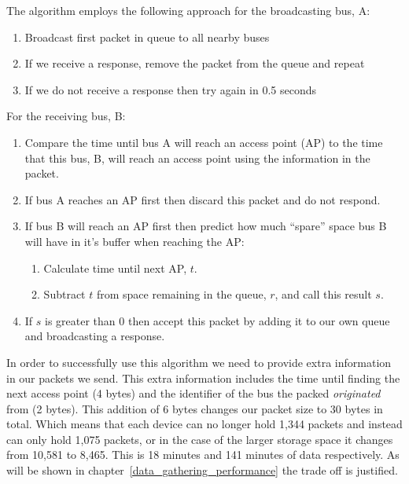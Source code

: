         The algorithm employs the following approach for the broadcasting bus, A:

        \begin{enumerate}
            \item Broadcast first packet in queue to all nearby buses
            \item If we receive a response, remove the packet from the queue and repeat
            \item If we do not receive a response then try again in 0.5 seconds
        \end{enumerate}

        For the receiving bus, B:

        \begin{enumerate}
            \item Compare the time until bus A will reach an access point (AP) to the time that this bus, B, will reach an access point using the information in the packet.
            \item If bus A reaches an AP first then discard this packet and do not respond.
            \item If bus B will reach an AP first then predict how much ``spare'' space bus B will have in it's buffer when reaching the AP:
                \begin{enumerate}
                    \item Calculate time until next AP, $t$.
                    \item Subtract $t$ from space remaining in the queue, $r$, and call this result $s$.
                \end{enumerate}
            \item If $s$ is greater than 0 then accept this packet by adding it to our own queue and broadcasting a response.
        \end{enumerate}

        In order to successfully use this algorithm we need to provide extra information in our packets we send. This extra information includes the time until finding the next access point (4 bytes) and the identifier of the bus the packed \emph{originated} from (2 bytes). This addition of 6 bytes changes our packet size to 30 bytes in total. Which means that each device can no longer hold 1,344 packets and instead can only hold 1,075 packets, or in the case of the larger storage space it changes from 10,581 to 8,465. This is 18 minutes and 141 minutes of data respectively. As will be shown in chapter~\ref{data_gathering_performance} the trade off is justified. 


